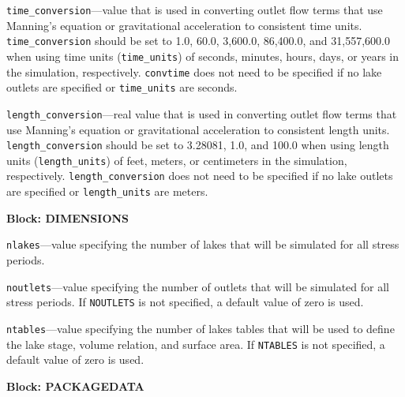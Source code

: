 \begin{description}
\item \texttt{time\_conversion}---value that is used in converting outlet flow terms that use Manning's equation or gravitational acceleration to consistent time units. \texttt{time\_conversion} should be set to 1.0, 60.0, 3,600.0, 86,400.0, and 31,557,600.0 when using time units (\texttt{time\_units}) of seconds, minutes, hours, days, or years in the simulation, respectively. \texttt{convtime} does not need to be specified if no lake outlets are specified or \texttt{time\_units} are seconds.

\item \texttt{length\_conversion}---real value that is used in converting outlet flow terms that use Manning's equation or gravitational acceleration to consistent length units. \texttt{length\_conversion} should be set to 3.28081, 1.0, and 100.0 when using length units (\texttt{length\_units}) of feet, meters, or centimeters in the simulation, respectively. \texttt{length\_conversion} does not need to be specified if no lake outlets are specified or \texttt{length\_units} are meters.

\end{description}
\item \textbf{Block: DIMENSIONS}

\begin{description}
\item \texttt{nlakes}---value specifying the number of lakes that will be simulated for all stress periods.

\item \texttt{noutlets}---value specifying the number of outlets that will be simulated for all stress periods. If \texttt{NOUTLETS} is not specified, a default value of zero is used.

\item \texttt{ntables}---value specifying the number of lakes tables that will be used to define the lake stage, volume relation, and surface area. If \texttt{NTABLES} is not specified, a default value of zero is used.

\end{description}
\item \textbf{Block: PACKAGEDATA}

